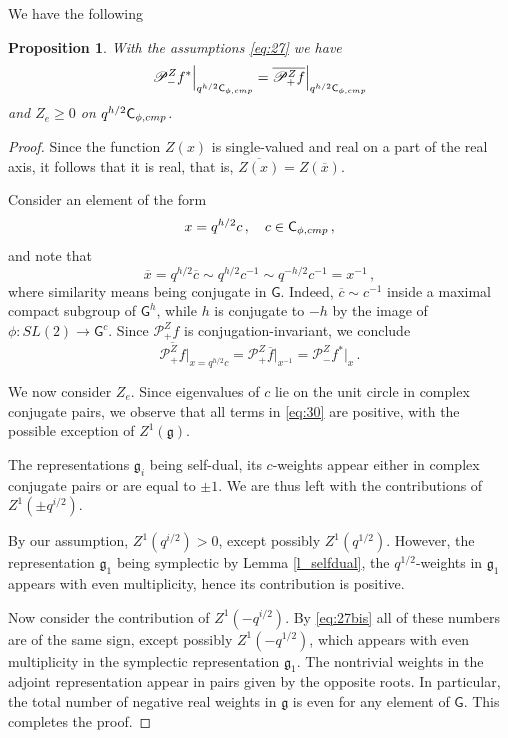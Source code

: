\documentclass[14pt]{extarticle}
\newcommand{\bG}{\mathsf{G}}
\newcommand{\bC}{\mathsf{C}}
\newcommand{\cP}{\mathscr{P}}
\newcommand{\fg}{\mathfrak{g}}
\newcommand{\comp}{\textup{cmp}}
\newtheorem{Proposition}[Lemma]{Proposition}
\theoremstyle{definition}
\begin{document}
 

 \subsubsection{}
 We have the following

 \begin{Proposition}\label{p_even} 
   With the assumptions \eqref{eq:27} we have
   \[
     \cP_{-}^Z f^* \Big|_{q^{h/2} \bC_{\phi,\comp}} =
   \overline{\cP_{+}^Z f} \Big|_{q^{h/2} \bC_{\phi,\comp}}
   \]
 and $Z_e \ge 0$ on $q^{h/2} \bC_{\phi,\comp}$. 
\end{Proposition}

\begin{proof}
Since the function $Z(x)$ is single-valued and real on a part of the
real axis, it follows that it is real, that is, $\overline{Z(x)} =
Z(\overline{x})$.

Consider an element of the form
\[
  x = q^{h/2} c \,, \quad c \in \bC_{\phi,\comp} \,, 
\]
and note that
\[
  \overline{x} =  q^{h/2} \overline{c} \sim q^{h/2} c^{-1} \sim 
q^{-h/2} c^{-1} = x^{-1} \,, 
\]
where similarity means being conjugate in $\bG$. Indeed,
$\overline{c}\sim c^{-1}$ inside a maximal compact subgroup of
$\bG^h$, while $h$ is conjugate to
$-h$ by the image of $\phi: SL(2)\to \bG^c$. 
Since $\cP_{+}^Z f$ is conjugation-invariant, we conclude 
\[
  \overline{\cP_{+}^Z f} \Big|_{x=q^{h/2}c }= \cP_{+}^Z \overline{f} \Big|_{x^{-1}} =
\cP_{-}^Z f^* \Big|_{x} \,.
\]

We now consider $Z_e$. Since eigenvalues of $c$ lie on the unit circle
in complex conjugate pairs, we observe that all terms in \eqref{eq:30}
are positive, with the possible exception of $Z^1(\fg)$.

The
representations $\fg_i$ being self-dual, its $c$-weights appear either
in complex conjugate pairs or are equal to $\pm 1$. We are thus left
with the contributions of $Z^1(\pm q^{i/2})$.

By our assumption, $Z^1(q^{i/2})>0$, except possibly $Z^1(q^{1/2})$.
However, the
representation $\fg_1$ being symplectic by Lemma \ref{l_selfdual}, the
$q^{1/2}$-weights in $\fg_1$ appears with even multiplicity, hence
its contribution is positive. 

Now consider the contribution of $Z^1(- q^{i/2})$. By \eqref{eq:27bis} all of these
numbers are of the same sign, except possibly $Z^1(- q^{1/2})$, which
appears with even multiplicity in the symplectic representation
$\fg_1$. The nontrivial weights in the adjoint
representation appear in pairs given by the opposite roots. In
particular, the total number of negative real weights in $\fg$ is even for
any element of $\bG$. This completes the proof. 
\end{proof}
\end{document}
